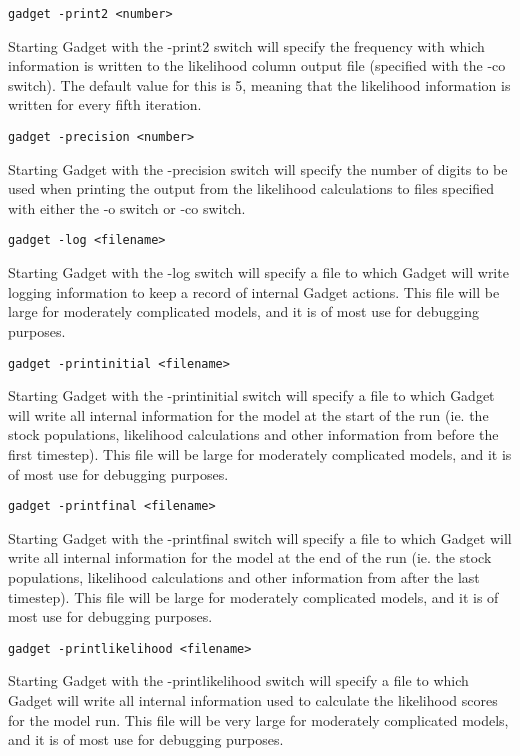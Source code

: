 \documentclass [a4paper, 10pt]{book}
\begin{document}
{\small\begin{verbatim}
gadget -print2 <number>
\end{verbatim}}
Starting Gadget with the -print2 switch will specify the frequency with which information is written to the likelihood column output file (specified with the -co switch).  The default value for this is 5, meaning that the likelihood information is written for every fifth iteration.

{\small\begin{verbatim}
gadget -precision <number>
\end{verbatim}}
Starting Gadget with the -precision switch will specify the number of digits to be used when printing the output from the likelihood calculations to files specified with either the -o switch or -co switch.

{\small\begin{verbatim}
gadget -log <filename>
\end{verbatim}}
Starting Gadget with the -log switch will specify a file to which Gadget will write logging information to keep a record of internal Gadget actions.  This file will be large for moderately complicated models, and it is of most use for debugging purposes.

{\small\begin{verbatim}
gadget -printinitial <filename>
\end{verbatim}}
Starting Gadget with the -printinitial switch will specify a file to which Gadget will write all internal information for the model at the start of the run (ie. the stock populations, likelihood calculations and other information from before the first timestep).  This file will be large for moderately complicated models, and it is of most use for debugging purposes.

{\small\begin{verbatim}
gadget -printfinal <filename>
\end{verbatim}}
Starting Gadget with the -printfinal switch will specify a file to which Gadget will write all internal information for the model at the end of the run (ie. the stock populations, likelihood calculations and other information from after the last timestep).  This file will be large for moderately complicated models, and it is of most use for debugging purposes.

\newpage %
{\small\begin{verbatim}
gadget -printlikelihood <filename>
\end{verbatim}}
Starting Gadget with the -printlikelihood switch will specify a file to which Gadget will write all internal information used to calculate the likelihood scores for the model run.  This file will be very large for moderately complicated models, and it is of most use for debugging purposes.
\end{document}
